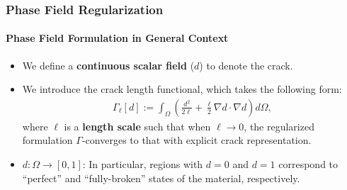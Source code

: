 \documentclass{beamer}
\newcommand{\SectionTwo}{Phase Field Formulation in General Context}
\let\cite\shortcite
\begin{document}
\begin{frame}
	\frametitle{Phase Field Regularization}
	\framesubtitle{\SectionTwo}
	\begin{itemize}
		\setlength\itemsep{2em}
		\item We define a \textbf{continuous scalar field} ($d$) to denote the crack.
		\item We introduce the crack length functional, which takes the following form:
		\begin{equation*}%
		\begin{aligned}
		\Gamma_\ell[d]:=\int_\Omega\left(\frac{d^2}{2\ell} + \frac{\ell}{2}\nabla d\cdot\nabla d\right) d\Omega,
		\end{aligned}
		\end{equation*}
		where $\ell$ is a \textbf{length scale} such that when $\ell\rightarrow0$, the regularized formulation $\Gamma$-converges to that with explicit crack representation. \cite{Maso2005}
		\item $d:\Omega\rightarrow[0,1]$: In particular, regions with $d = 0$ and $d = 1$ correspond to ``perfect'' and ``fully-broken'' states of the material, respectively.
	\end{itemize}
\end{frame}
\end{document}
